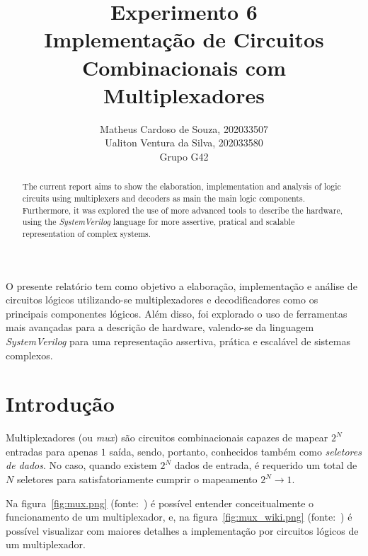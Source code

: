 \documentclass[12pt]{article}
\title{Experimento 6\\
Implementação de Circuitos Combinacionais com Multiplexadores}
\author{Matheus Cardoso de Souza, 202033507\\
        Ualiton Ventura da Silva, 202033580\\
        Grupo G42
}
\begin{document}
\maketitle

 \begin{abstract}
   The current report aims to show the elaboration, implementation and analysis
   of logic circuits using multiplexers and decoders as main the main logic
   components. Furthermore, it was explored the use of more advanced tools to
   describe the hardware, using the \emph{SystemVerilog} language for more
   assertive, pratical and scalable representation of complex systems.
 \end{abstract}

 \begin{resumo}
   O presente relatório tem como objetivo a elaboração, implementação e análise
   de circuitos lógicos utilizando-se multiplexadores e decodificadores como os
   principais componentes lógicos. Além disso, foi explorado o uso de
   ferramentas mais avançadas para a descrição de hardware, valendo-se da
   linguagem \emph{SystemVerilog} para uma representação assertiva, prática e
   escalável de sistemas complexos.
 \end{resumo}


\section{Introdução}
\label{sec:Introducao}

Multiplexadores (ou \emph{mux}) são circuitos combinacionais capazes de mapear
$2^{N}$ entradas para apenas $1$ saída, sendo, portanto, conhecidos também como
\emph{seletores de dados}. No caso, quando existem $2^{N}$ dados de entrada, é
requerido um total de $N$ seletores para satisfatoriamente cumprir o mapeamento
$2^{N} \rightarrow 1$.

Na figura~\ref{fig:mux.png} (fonte:~\cite{isc_mod3}) é possível
entender conceitualmente o funcionamento de um multiplexador, e, na
figura~\ref{fig:mux_wiki.png} (fonte:~\cite{wiki_mux}) é possível visualizar com
maiores detalhes a implementação por circuitos lógicos de um multiplexador.
\end{document}
